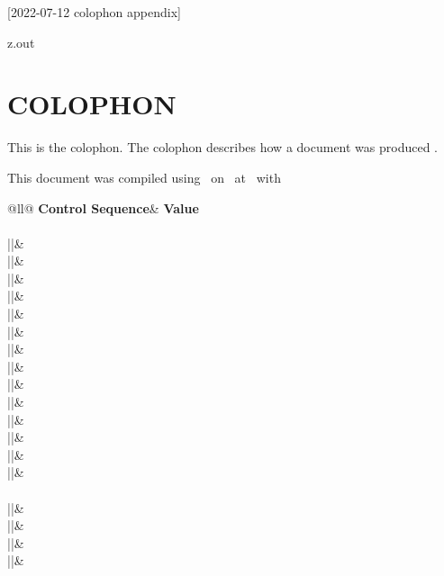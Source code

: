 [2022-07-12 colophon appendix]

\begin{VerbatimOut}{z.out}
\chapter*{COLOPHON}
\label{ap:colophon}


This is the colophon.
The colophon describes how a document was produced
\cite{diggypod-colophon}.

This document was compiled using \PurdueThesisVersion\ on \ZZDateRun\ at \ZZTimeRun\ with

\begin{inlinetable}
  \begin{tabular}{@{}ll@{}}
    \toprule
    \textbf{Control Sequence}& \textbf{Value}\\
    \midrule
    \\
    |\ZZinstitution|& \ZZinstitution\\
    |\ZZcampus|& \ZZcampus\\
    |\ZZprogram|& \ZZprogram\\
    |\ZZdegree|& \ZZdegree\\
    |\ZZauthor|& \ZZauthor\\
    |\ZZdocument|& \ZZdocument\\
    |\ZZgraduation|& \ZZgraduation\\
    |\ZZtitle|& \ZZtitle\\
    \noalign{\vspace*{6pt}}
    |\ZZshowcolophon|& \ZZshowcolophon\\
    |\ZZshowdiagonalline|& \ZZshowdiagonalline\\
    |\ZZshowgridlines|& \ZZshowgridlines\\
    |\ZZshowmarginlines|& \ZZshowmarginlines\\
    |\ZZshowtimestamp|& \ZZshowtimestamp\\
    |\ZZtodonotes|& \ZZtodonotes\\
    \noalign{\vspace*{12pt}}
    \\
    |\ZZins|& \ZZins\\
    |\ZZcam|& \ZZcam\\
    |\ZZpro|& \ZZpro\\
    |\ZZdeg|& \ZZdeg\\

\end{tabular}
\end{inlinetable}
\end{VerbatimOut}
